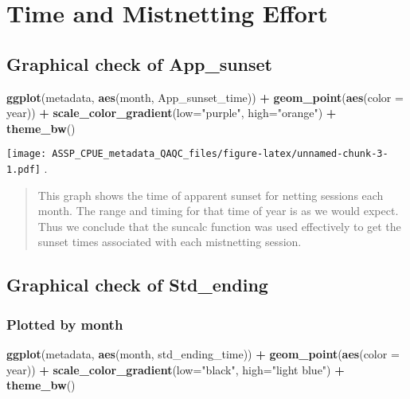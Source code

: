 \documentclass[
]{article}
\newenvironment{Shaded}{\begin{snugshade}}{\end{snugshade}}
\newcommand{\DataTypeTok}[1]{\textcolor[rgb]{0.13,0.29,0.53}{#1}}
\newcommand{\KeywordTok}[1]{\textcolor[rgb]{0.13,0.29,0.53}{\textbf{#1}}}
\newcommand{\NormalTok}[1]{#1}
\newcommand{\OperatorTok}[1]{\textcolor[rgb]{0.81,0.36,0.00}{\textbf{#1}}}
\newcommand{\StringTok}[1]{\textcolor[rgb]{0.31,0.60,0.02}{#1}}
\begin{document}
\hypertarget{time-and-mistnetting-effort}{%
\section{Time and Mistnetting
Effort}\label{time-and-mistnetting-effort}}

\hypertarget{graphical-check-of-app_sunset}{%
\subsection{Graphical check of
App\_sunset}\label{graphical-check-of-app_sunset}}

\begin{Shaded}
\begin{Highlighting}[]
\KeywordTok{ggplot}\NormalTok{(metadata, }\KeywordTok{aes}\NormalTok{(month, App_sunset_time)) }\OperatorTok{+}
\StringTok{  }\KeywordTok{geom_point}\NormalTok{(}\KeywordTok{aes}\NormalTok{(}\DataTypeTok{color =}\NormalTok{ year)) }\OperatorTok{+}
\StringTok{  }\KeywordTok{scale_color_gradient}\NormalTok{(}\DataTypeTok{low=}\StringTok{"purple"}\NormalTok{, }\DataTypeTok{high=}\StringTok{"orange"}\NormalTok{) }\OperatorTok{+}
\StringTok{  }\KeywordTok{theme_bw}\NormalTok{()}
\end{Highlighting}
\end{Shaded}

\texttt{[image: ASSP\_CPUE\_metadata\_QAQC\_files/figure-latex/unnamed-chunk-3-1.pdf]}
.

\begin{quote}
This graph shows the time of apparent sunset for netting sessions each
month. The range and timing for that time of year is as we would expect.
Thus we conclude that the suncalc function was used effectively to get
the sunset times associated with each mistnetting session.
\end{quote}

\hypertarget{graphical-check-of-std_ending}{%
\subsection{Graphical check of
Std\_ending}\label{graphical-check-of-std_ending}}

\hypertarget{plotted-by-month}{%
\subsubsection{Plotted by month}\label{plotted-by-month}}

\begin{Shaded}
\begin{Highlighting}[]
\KeywordTok{ggplot}\NormalTok{(metadata, }\KeywordTok{aes}\NormalTok{(month, std_ending_time)) }\OperatorTok{+}
\StringTok{  }\KeywordTok{geom_point}\NormalTok{(}\KeywordTok{aes}\NormalTok{(}\DataTypeTok{color =}\NormalTok{ year)) }\OperatorTok{+}
\StringTok{  }\KeywordTok{scale_color_gradient}\NormalTok{(}\DataTypeTok{low=}\StringTok{"black"}\NormalTok{, }\DataTypeTok{high=}\StringTok{"light blue"}\NormalTok{) }\OperatorTok{+}
\StringTok{  }\KeywordTok{theme_bw}\NormalTok{()}
\end{Highlighting}
\end{Shaded}
\end{document}

